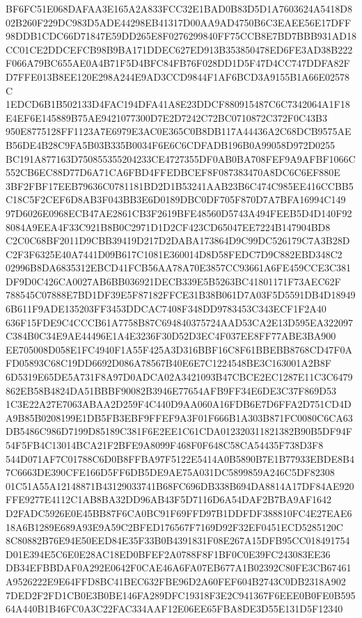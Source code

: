 \documentclass[UTF8,fontset=fandol,zihao=-4,a4paper]{ctexart}
\begin{document}
{{BF6FC51E068DAFAA3E165A2A833FCC32E1BAD0B83D5D1A7603624A5418D802B260F229DC983D5ADE44298EB41317D00AA9AD4750B6C3EAEE56E17DFF
98DDB1CDC66D71847E59DD265E8F0276299840FF75CCB8E7BD7BBB931AD18CC01CE2DDCEFCB98B9BA171DDEC627ED913B353850478ED6FE3AD38B222
F066A79BC655AE0A4B71F5D4BFC84FB76F028DD1D5F47D4CC747DDFA82FD7FFE013B8EE120E298A244E9AD3CCD9844F1AF6BCD3A9155B1A66E02578C
1EDCD6B1B502133D4FAC194DFA41A8E23DDCF880915487C6C7342064A1F18E4EF6E145889B75AE9421077300D7E2D7242C72BC0710872C372F0C43B3
950E8775128FF1123A7E6979E3AC0E365C0B8DB117A44436A2C68DCB9575AEB56DE4B28C9FA5B03B335B0034F6E6C6CDFADB196B0A99058D972D0255
BC191A877163D750855355204233CE4727355DF0AB0BA708FEF9A9AFBF1066C552CB6EC88D77D6A71CA6FBD4FFEDBCEF8F087383470A8DC6C6EF880E
3BF2FBF17EEB79636C0781181BD2D1B53241AAB23B6C474C985EE416CCBB5C18C5F2CEF6D8AB3F043BB3E6D0189DBC0DF705F870D7A7BFA16994C149
97D6026E0968ECB47AE2861CB3F2619BFE48560D5743A494FEEB5D4D140F928084A9EEA4F33C921B8B0C2971D1D2CF423CD65047EE7224B147904BD8
C2C0C68BF2011D9CBB39419D217D2DABA173864D9C99DC526179C7A3B28DC2F3F6325E40A7441D09B617C1081E360014D8D58FEDC7D9C882EBD348C2
02996B8DA6835312EBCD41FCB56AA78A70E3857CC93661A6FE459CCE3C381DF9D0C426CA0027AB6BB036921DECB339E5B5263BC41801171F73AEC62F
788545C07888E7BD1DF39E5F87182FFCE31B38B061D7A03F5D5591DB4D189496B611F9ADE135203FF3453DDCAC7408F348DD9783453C343ECF1F2A40
636F15FDE9C4CCCB61A7758B87C694840375724AAD53CA2E13D595EA322097C384B0C34E9AE44496E1A4E3236F30D52D3EC4F037EE8FF77ABE3BA900
EE705008D058E1FC4940F1A55F425A3D316BBF16C8F61BBEBB8768CD47F0AFD05893C68C19DD6692D086A78567B40E6E7C1224548BE3C163001A2B8F
6D5319E65DE5A731F8A97D0ADCA02A3421093B47CBCE2EC1287E11C3C6479862EB58B4824DA51BBBF90082B3946E77654AFB9FF34E6DE3C37F869D53
1C3E22A27E7063ABAA2D259F4C440D9AA060A16FDB6E7D6FFA2D751CD4DA9B85B0208199E1DB5FB3EBF9FFEF9A3F01F666B1A303B871FC0080C6CA63
DB5486C986D7199D85189C381F6E2EE1C61CDA012320311821382B90B5DF94F54F5FB4C13014BCA21F2BFE9A8099F468F0F648C58CA54435F738D3F8
544D071AF7C01788C6D0B8FFBA97F5122E5414A0B5890B7E1B77933EBDE8B47C6663DE390CFE166D5FF6DB5DE9AE75A031DC5899859A246C5DF82308
01C51A55A12148871B43129033741B68FC696DB338B694DA8814A17DF84AE920FFE9277E4112C1AB8BA32DD96AB43F5D7116D6A54DAF2B7BA9AF1642
D2FADC5926E0E45BB87F6CA0BC91F69FFD97B1DDFDF388810FC4E27EAE618A6B1289E689A93E9A59C2BFED176567F7169D92F32EF0451ECD5285120C
8C80882B76E94E50EED84E35F33B0B4391831F08E267A15DFB95CC018491754D01E394E5C6E0E28AC18ED0BFEF2A0788F8F1BF0C0E39FC243083EE36
DB34EFBBDAF0A292E0642F0CAE46A6FA07EB677A1B02392C80FE3CB67461A9526222E9E64FFD8BC41BEC632FBE96D2A60FEF604B2743C0DB2318A902
7DED2F2FD1CB0E3B0BE146FA289DFC19318F3E2C941367F6EEE0B0FE0B59564A440B1B46FC0A3C22FAC334AAF12E06EE65FBA8DE3D55E131D5F12340
}}
\end{document}
